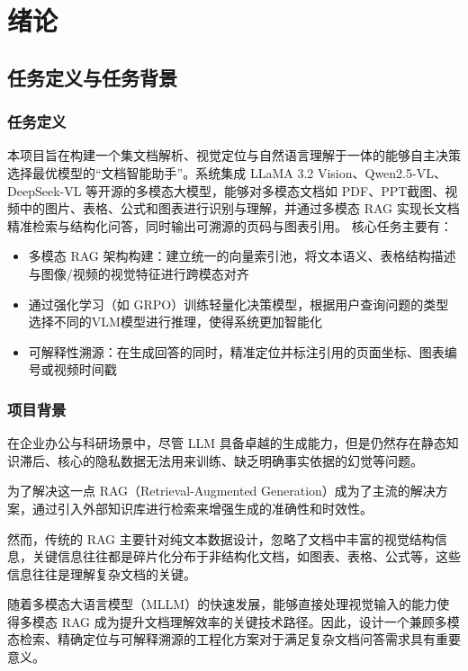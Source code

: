 \chapter{绪论}

\section{任务定义与任务背景}

\subsection{任务定义} 

本项目旨在构建一个集文档解析、视觉定位与自然语言理解于一体的能够自主决策选择最优模型的“文档智能助手”。系统集成 LLaMA 3.2 Vision、Qwen2.5-VL、DeepSeek-VL 等开源的多模态大模型，能够对多模态文档如 PDF、PPT截图、视频中的图片、表格、公式和图表进行识别与理解，并通过多模态 RAG 实现长文档精准检索与结构化问答，同时输出可溯源的页码与图表引用。
核心任务主要有：

\begin{itemize}
    \item 多模态 RAG 架构构建：建立统一的向量索引池，将文本语义、表格结构描述与图像/视频的视觉特征进行跨模态对齐
    \item 通过强化学习（如 GRPO）训练轻量化决策模型，根据用户查询问题的类型选择不同的VLM模型进行推理，使得系统更加智能化
    \item 可解释性溯源：在生成回答的同时，精准定位并标注引用的页面坐标、图表编号或视频时间戳
\end{itemize}

\subsection{项目背景} 

在企业办公与科研场景中，尽管 LLM 具备卓越的生成能力，但是仍然存在静态知识滞后、核心的隐私数据无法用来训练、缺乏明确事实依据的幻觉等问题。

为了解决这一点 RAG（Retrieval-Augmented Generation）成为了主流的解决方案，通过引入外部知识库进行检索来增强生成的准确性和时效性。

然而，传统的 RAG 主要针对纯文本数据设计，忽略了文档中丰富的视觉结构信息，关键信息往往都是碎片化分布于非结构化文档，如图表、表格、公式等，这些信息往往是理解复杂文档的关键。

随着多模态大语言模型（MLLM）的快速发展，能够直接处理视觉输入的能力使得多模态 RAG 成为提升文档理解效率的关键技术路径。因此，设计一个兼顾多模态检索、精确定位与可解释溯源的工程化方案对于满足复杂文档问答需求具有重要意义。


